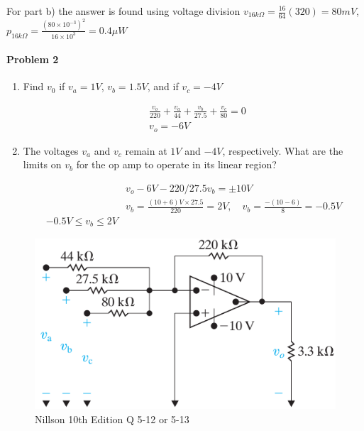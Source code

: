 {For part b) the answer is found using voltage division $v_{16 k \Omega} =\frac{16}{64}(320)=80 m V$, $p_{16 k \Omega}=\frac{(80 \times 10^{-3})^2}{16 \times 10^3}= 0.4 \mu W$

\paragraph{Problem 2}

\begin{enumerate}[label=(\alph*)]
	\item Find $v_0$ if $v_a = 1V$, $v_b =1.5V$, and if $v_c = -4V$
	
	\begin{align*}
	& \frac{v_o}{220} + \frac{v_a}{44}+\frac{v_b}{27.5} + \frac{v_c}{80}=0\\
	& v_o = -6 V
	\end{align*}
	\item The voltages $v_a$ and $v_c$ remain at $1V$ and $-4V$, respectively. What are the limits on $v_b$ for the
	op amp to operate in its linear region?
	
	\begin{align*}
	& v_o -6 V - 220/27.5 v_b = \pm 10 V \\
	& v_b = \frac{(10+6)V \times 27.5}{220}= 2V, \quad v_b = \frac{-(10-6)}{8}=-0.5 V \\
	-0.5V \leq v_b \leq 2V
	\end{align*}
\end{enumerate}
\begin{figure}[H]
	\centering
	\includegraphics[width=1\linewidth]{images/P2Nillson10thQ5_12_513}
	\caption{Nillson 10th Edition Q 5-12 or 5-13}
	\label{fig:p2nillson10thq512513}
\end{figure}
}
